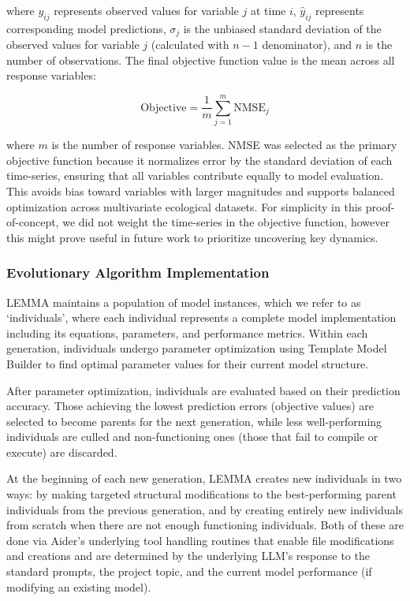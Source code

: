 where $y_{ij}$ represents observed values for variable $j$ at time $i$, $\hat{y}_{ij}$ represents corresponding model predictions, $\sigma_j$ is the unbiased standard deviation of the observed values for variable $j$ (calculated with $n-1$ denominator), and $n$ is the number of observations. The final objective function value is the mean across all response variables:

\begin{equation}
    \text{Objective} = \frac{1}{m} \sum_{j=1}^{m} \text{NMSE}_j
\end{equation}

where $m$ is the number of response variables. NMSE was selected as the primary objective function because it normalizes error by the standard deviation of each time-series, ensuring that all variables contribute equally to model evaluation. This avoids bias toward variables with larger magnitudes and supports balanced optimization across multivariate ecological datasets. For simplicity in this proof-of-concept, we did not weight the time-series in the objective function, however this might prove useful in future work to prioritize uncovering key dynamics.

\subsubsection{Evolutionary Algorithm Implementation}

LEMMA maintains a population of model instances, which we refer to as `individuals', where each individual represents a complete model implementation including its equations, parameters, and performance metrics. Within each generation, individuals undergo parameter optimization using Template Model Builder to find optimal parameter values for their current model structure. 

After parameter optimization, individuals are evaluated based on their prediction accuracy. Those achieving the lowest prediction errors (objective values) are selected to become parents for the next generation, while less well-performing individuals are culled and non-functioning ones (those that fail to compile or execute) are discarded. 

At the beginning of each new generation, LEMMA creates new individuals in two ways: by making targeted structural modifications to the best-performing parent individuals from the previous generation, and by creating entirely new individuals from scratch when there are not enough functioning individuals. Both of these are done via Aider's underlying tool handling routines that enable file modifications and creations and are determined by the underlying LLM's response to the standard prompts, the project topic, and the current model performance (if modifying an existing model).

